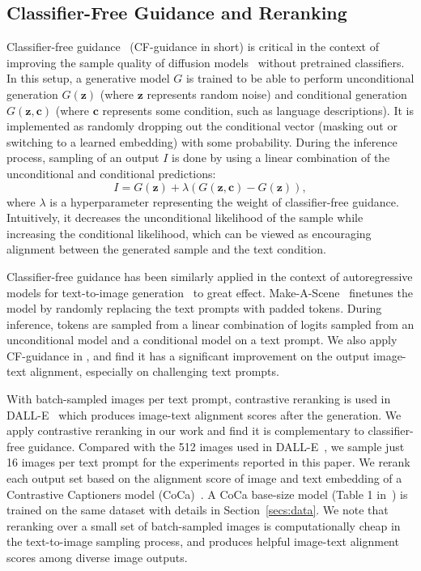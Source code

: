 \subsection{Classifier-Free Guidance and Reranking} \label{secs:sampling_cf_coca}
Classifier-free guidance~\cite{ho2021classifier} (CF-guidance in short) is critical in the context of improving the sample quality of diffusion models~\cite{nichol2021glide, ramesh2022hierarchical, imagen} without pretrained classifiers. In this setup, a generative model $G$ is trained to be able to perform unconditional generation $G(\mathbf {z})$ (where $\mathbf {z}$ represents random noise) and conditional generation $G(\mathbf {z}, \mathbf{c})$ (where $\mathbf{c}$ represents some condition, such as language descriptions). It is implemented as randomly dropping out the conditional vector (masking out or switching to a learned embedding) with some probability. During the inference process, sampling of an output $I$ is done by using a linear combination of the unconditional and conditional predictions:
\begin{equation}  \label{eq:cf_eq}
I = G(\mathbf {z}) + \lambda (G(\mathbf {z}, \mathbf{c}) - G(\mathbf {z})),
\end{equation}
where $\lambda$ is a hyperparameter representing the weight of classifier-free guidance. Intuitively, it decreases the unconditional likelihood of the sample while increasing the conditional likelihood, which can be viewed as encouraging alignment between the generated sample and the text condition.

Classifier-free guidance has been similarly applied in the context of autoregressive models for text-to-image generation~\cite{crowson2021classifier, gafni2022make} to great effect. Make-A-Scene~\cite{gafni2022make} finetunes the model by randomly replacing the text prompts with padded tokens. During inference, tokens are sampled from a linear combination of logits sampled from an unconditional model and a conditional model on a text prompt. We also apply CF-guidance in \bdraw, and find it has a significant improvement on the output image-text alignment, especially on challenging text prompts.

With batch-sampled images per text prompt, contrastive reranking is used in DALL-E~\cite{ramesh2021zero} which produces image-text alignment scores after the generation. We apply contrastive reranking in our work and find it is complementary to classifier-free guidance. Compared with the 512 images used in DALL-E~\cite{ramesh2021zero}, we sample just 16 images per text prompt for the experiments reported in this paper. We rerank each output set based on the alignment score of image and text embedding of a Contrastive Captioners model (CoCa)~\cite{yu2022coca}. A CoCa base-size model (Table 1 in~\cite{yu2022coca}) is trained on the same dataset with details in Section~\ref{secs:data}. We note that reranking over a small set of batch-sampled images is computationally cheap in the text-to-image sampling process, and produces helpful image-text alignment scores among diverse image outputs.